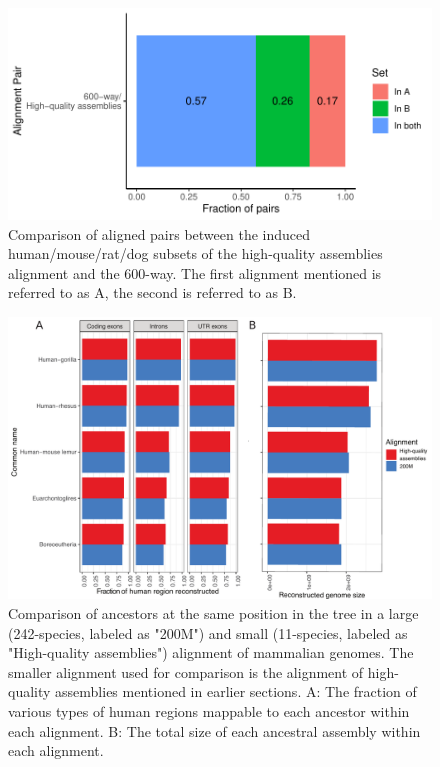 \documentclass{article}
\begin{document}
\begin{figure}
    \centering
    \includegraphics[width=\textwidth]{cactus_alignments_vs_cactus_alignments.pdf}
    \caption{
    Comparison of aligned pairs between the induced human/mouse/rat/dog subsets of the high-quality assemblies alignment and the 600-way. The first alignment mentioned is referred to as A, the second is referred to as B.}
    \label{fig:cactusAlignmentComparisons}
\end{figure}

\begin{figure}
    \centering
    \includegraphics[width=\textwidth]{200mvs11wayancestorscombined.pdf}
    \caption{Comparison of ancestors at the same position in the tree in a large (242-species, labeled as "200M") and small (11-species, labeled as "High-quality assemblies") alignment of mammalian genomes. The smaller alignment used for comparison is the alignment of high-quality assemblies mentioned in earlier sections. A: The fraction of various types of human regions mappable to each ancestor within each alignment. B: The total size of each ancestral assembly within each alignment.}
    \label{fig:mammalAncestorComparison} 
\end{figure}
\end{document}
